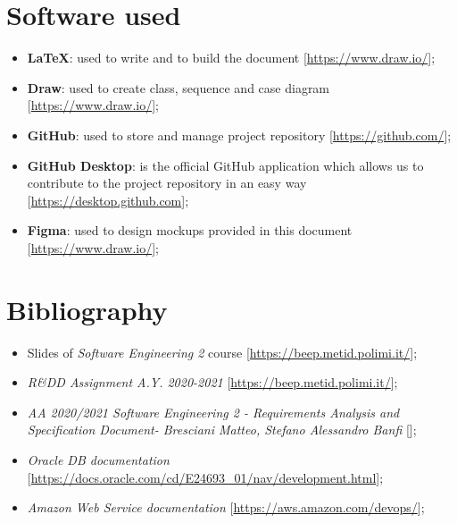 \section{Software used}

\begin{itemize}
\item \textbf{\LaTeX}: used to write and to build the document [\url{https://www.draw.io/}];
\item\textbf{Draw}: used to create class, sequence and case diagram [\url{https://www.draw.io/}];
\item\textbf{GitHub}: used to store and manage project repository [\url{https://github.com/}];
\item\textbf{GitHub Desktop}: is the official GitHub application which allows us to contribute to the project repository in an easy way [\url{https://desktop.github.com}];
\item\textbf{Figma}: used to design mockups provided in this document [\url{https://www.draw.io/}];
\begin{comment}
\item\textbf{}:;
\item\textbf{}:;
\item\textbf{}:;
\end{comment}
\end{itemize}



\section{Bibliography}
\begin{itemize}
\item Slides of \textit{Software Engineering 2} course [\url{https://beep.metid.polimi.it/}];
\item \textit{R\&DD Assignment A.Y. 2020-2021} 
[\url{https://beep.metid.polimi.it/}];
\item \textit{AA 2020/2021 Software Engineering 2 - \textit{Requirements Analysis and Specification Document}- Bresciani Matteo, Stefano Alessandro Banfi} 
[\url{}]; 
\item \textit{Oracle DB documentation} 
[\url{https://docs.oracle.com/cd/E24693_01/nav/development.html}]; 
\item \textit{Amazon Web Service documentation} [\url{https://aws.amazon.com/devops/}];
\end{itemize}

